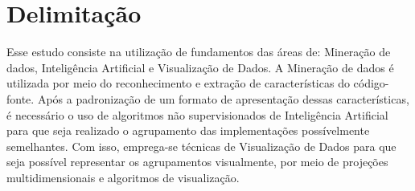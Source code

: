 \chapter{Delimitação}

Esse estudo consiste na utilização de fundamentos das áreas de: Mineração de
dados, Inteligência Artificial e Visualização de Dados. A Mineração de dados
é utilizada por meio do reconhecimento e extração de características do código-fonte.
Após a padronização de um formato de apresentação dessas características, é
necessário o uso de algoritmos não supervisionados de Inteligência Artificial para
que seja realizado o agrupamento das implementações possívelmente semelhantes.
Com isso, emprega-se técnicas de Visualização de Dados para que seja possível
representar os agrupamentos visualmente, por meio de projeções multidimensionais
e algoritmos de visualização.